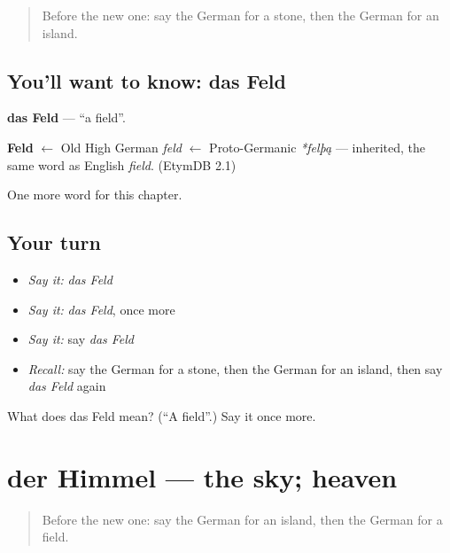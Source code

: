 \label{lesson:GE-C83-feld}



\begin{quote}
Before the new one: say the German for a stone, then the German for an island.
\end{quote}

\subsection*{You'll want to know: das Feld}
\textbf{das Feld} — \textquotedblleft{}a field\textquotedblright{}.

\begin{cousinweb}
\textbf{Feld} $\leftarrow$ Old High German \emph{feld} $\leftarrow$ Proto-Germanic \emph{*felþą} — inherited, the same word as English \emph{field}. (EtymDB 2.1)
\end{cousinweb}

\begin{grammarlens}[title={What you've built}]
One more word for this chapter.
\end{grammarlens}

\subsection*{Your turn}
\begin{itemize}
\raggedright
  \item \emph{Say it:} \emph{das Feld}
  \item \emph{Say it:} \emph{das Feld}, once more
  \item \emph{Say it:} say \emph{das Feld}
  \item \emph{Recall:} say the German for a stone, then the German for an island, then say \emph{das Feld} again
\end{itemize}

\begin{tcolorbox}[breakable,colback=teal!4,colframe=teal!35!black,title={Before you move on}]
What does das Feld mean? (\textquotedblleft{}A field\textquotedblright{}.) Say it once more.
\end{tcolorbox}
\section[der Himmel]{der Himmel — the sky; heaven}

\label{lesson:GE-C83-himmel}



\begin{quote}
Before the new one: say the German for an island, then the German for a field.
\end{quote}

